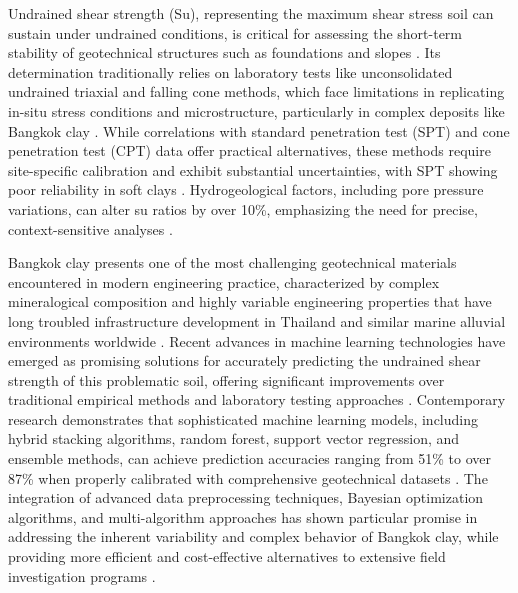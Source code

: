 \documentclass[12pt,a4paper]{article}
\begin{document}
	Undrained shear strength (Su), representing the maximum shear stress soil can sustain under undrained conditions, is critical for assessing the short-term stability of geotechnical structures such as foundations and slopes \cite{doi:10.1680/geot.1984.34.4.449}. Its determination traditionally relies on laboratory tests like unconsolidated undrained triaxial and falling cone methods, which face limitations in replicating in-situ stress conditions and microstructure, particularly in complex deposits like Bangkok clay \cite{doi:10.1680/geot.1984.34.4.449,10.1520/GTJ20170127}. While correlations with standard penetration test (SPT) and cone penetration test (CPT) data offer practical alternatives, these methods require site-specific calibration and exhibit substantial uncertainties, with SPT showing poor reliability in soft clays \cite{ma15186385,10.1520/GTJ20170127,Sepúlveda28052025}. Hydrogeological factors, including pore pressure variations, can alter su ratios by over 10\%, emphasizing the need for precise, context-sensitive analyses \cite{belcavello2024influence}.
	
	Bangkok clay presents one of the most challenging geotechnical materials encountered in modern engineering practice, characterized by complex mineralogical composition and highly variable engineering properties that have long troubled infrastructure development in Thailand and similar marine alluvial environments worldwide \cite{phai2019,Pithan_Pairojn_2020}. Recent advances in machine learning technologies have emerged as promising solutions for accurately predicting the undrained shear strength of this problematic soil, offering significant improvements over traditional empirical methods and laboratory testing approaches \cite{app121910177,Demir_Sahin_2024,doi:10.1177/03611981241278354}. Contemporary research demonstrates that sophisticated machine learning models, including hybrid stacking algorithms, random forest, support vector regression, and ensemble methods, can achieve prediction accuracies ranging from 51\% to over 87\% when properly calibrated with comprehensive geotechnical datasets \cite{Demir_Sahin_2024,doi:10.1177/03611981241278354,su12062218}. The integration of advanced data preprocessing techniques, Bayesian optimization algorithms, and multi-algorithm approaches has shown particular promise in addressing the inherent variability and complex behavior of Bangkok clay, while providing more efficient and cost-effective alternatives to extensive field investigation programs \cite{Demir_Sahin_2024,doi:10.1177/03611981241278354,app13095418}.
	
\end{document}
